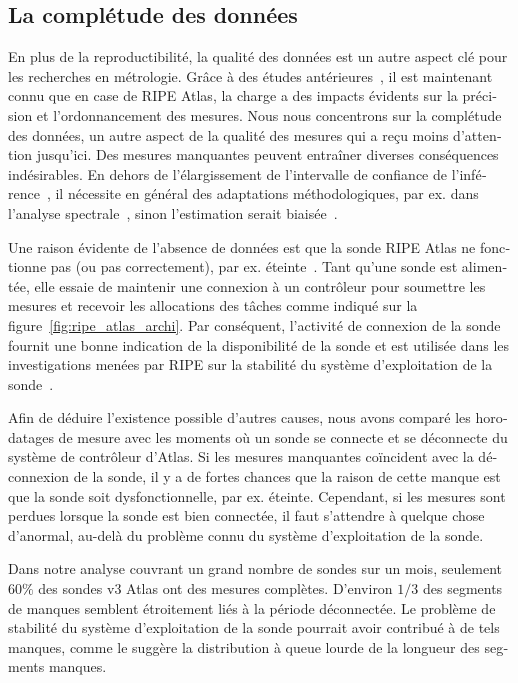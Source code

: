 \begin{otherlanguage}{french}
\subsection*{La complétude des données}

En plus de la reproductibilité, la qualité des données est un autre aspect clé pour les recherches en métrologie.
Grâce à des études antérieures~\cite{Holterbach2015a, Bajpai2015}, il est maintenant connu que en case de RIPE Atlas, la charge a des impacts évidents sur la précision et l'ordonnancement des mesures.
Nous nous concentrons sur la complétude des données, un autre aspect de la qualité des mesures qui a reçu moins d'attention jusqu'ici. 
Des mesures manquantes peuvent entraîner diverses conséquences indésirables.
En dehors de l'élargissement de l'intervalle de confiance de l'inférence~\cite{Fontugne2016}, 
il nécessite en général des adaptations méthodologiques, par ex. dans l'analyse spectrale~\cite{Babu2010, Luckie2014, shao2016}, 
sinon l'estimation serait biaisée~\cite{Baraldi2010}.

Une raison évidente de l'absence de données est que la sonde RIPE Atlas ne fonctionne pas (ou pas correctement), par ex. éteinte~\cite{schedule}.
Tant qu'une sonde est alimentée, elle essaie de maintenir une connexion à un contrôleur pour soumettre les mesures et recevoir les allocations des tâches comme indiqué sur la figure~\ref{fig:ripe_atlas_archi}.
Par conséquent, l'activité de connexion de la sonde fournit une bonne indication de la disponibilité de la sonde et 
est utilisée dans les investigations menées par RIPE sur la stabilité du système d'exploitation de la sonde~\cite{1look, 2look, 3look}.

Afin de déduire l'existence possible d'autres causes, nous avons comparé les horodatages de mesure avec 
les moments où un sonde se connecte et se déconnecte du système de contrôleur d'Atlas.
Si les mesures manquantes coïncident avec la déconnexion de la sonde, 
il y a de fortes chances que la raison de cette manque est que la sonde soit dysfonctionnelle, par ex. éteinte.
Cependant, si les mesures sont perdues lorsque la sonde est bien connectée, 
il faut s'attendre à quelque chose d'anormal, au-delà du problème connu du système d'exploitation de la sonde.

Dans notre analyse couvrant un grand nombre de sondes sur un mois, seulement $60\%$ des sondes v3 Atlas ont des mesures complètes. 
D'environ $1/3$ des segments de manques semblent étroitement liés à la période déconnectée. 
Le problème de stabilité du système d'exploitation de la sonde pourrait avoir contribué à de tels manques, 
comme le suggère la distribution à queue lourde de la longueur des segments manques.


\end{otherlanguage}
